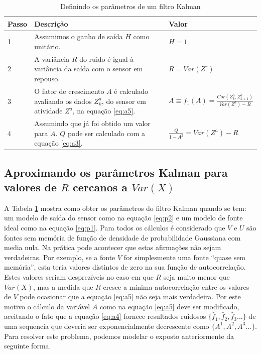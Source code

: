 \documentclass[a4paper,10pt]{article}
\begin{document}
\begin{table}[!ht]
\centering
\caption{Definindo os parâmetros de um filtro Kalman}
\vspace{0.5cm}
\begin{tabular}{ l | p{5.0cm} | >{\centering\arraybackslash}m{3.5cm}}
\hline     
Passo & Descrição & Valor \\ %
\hline                               %
\hline    
1 & Assumimos o ganho de saída $H$ como unitário. & $H=1$ \\ \hline    
2 & A variância $R$ do ruido é igual à variância da saída com o sensor em repouso. & $R=Var(Z^r)$ \\ \hline    
3 & O fator de crescimento $A$ é calculado avaliando os dados $Z^a_k$, do sensor em atividade $Z^a$, na equação \eqref{eq:a5}. & $A \equiv f_1(A) = \frac{Cor(Z^a_k,Z^a_{k+1})}{Var(Z^a)-R}$ \\ \hline    
4 & Assumindo que já foi obtido um valor para $A$. $Q$ pode ser calculado com a equação \eqref{eq:a3}. & $ \frac{Q}{1-A^2}=Var(Z^a)-R$ \\ \hline     
\end{tabular}
\label{tab:tab1}
\end{table}

\subsection{Aproximando os parâmetros Kalman para valores de $R$ cercanos a $Var(X)$} \label{sec:Avalue}

A Tabela \ref{tab:tab1} mostra como obter os parâmetros do filtro Kalman quando  
se tem: um modelo de saída do sensor como na equação \eqref{eq:p2} e um modelo de fonte 
ideal como na equação \eqref{eq:p1}. Para todos os cálculos é considerado que $V$ e $U$ são fontes sem memória
de função de densidade de probabilidade Gaussiana com media nula. Na prática pode acontecer que estas
afirmações não sejam verdadeiras. Por exemplo, se a fonte $V$ for simplesmente uma
fonte ``quase sem memória'', esta teria  valores distintos de zero na sua função de autocorrelação.
Estes valores seriam desprezíveis no caso em que $R$ seja muito menor que $Var(X)$,
mas a medida que $R$ cresce a mínima autocorrelação entre os valores de $V$ pode ocasionar
que a equação \eqref{eq:a5} não seja mais verdadeira. Por este motivo o cálculo da variável $A$
como na equação \eqref{eq:a5} deve ser modificado, aceitando o fato que a equação \eqref{eq:a4}
fornece resultados ruidosos $\{\hat{f}_1, \hat{f}_2, \hat{f}_3... \}$ de uma sequencia
que deveria ser exponencialmente  decrescente como $\{A^1, A^2, A^3... \}$.
Para resolver este problema, podemos modelar o exposto anteriormente da seguinte forma.
\end{document}
